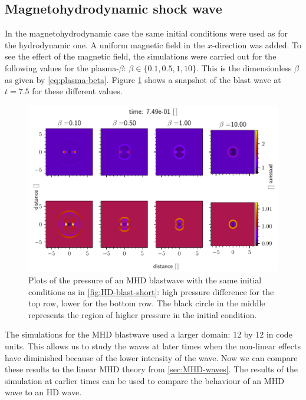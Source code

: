 \subsection{Magnetohydrodynamic shock wave}
In the magnetohydrodynamic case the same initial conditions were used as for the hydrodynamic one.
A uniform magnetic field in the $x$-direction was added. 
To see the effect of the magnetic field, the simulations were carried out for the following values for the plasma-$\beta$: $\beta \in \{0.1, 0.5,1,10\}$.
This is the dimensionless $\beta$ as given by \cref{eq:plasma-beta}.
Figure \ref{fig:MHD-blasts} shows a snapshot of the blast wave at $t=7.5$ for these different values.

\begin{figure}[H]
	\centering
	\includegraphics[width=\linewidth]{images/MHD-blasts.pdf}
	\caption{Plots of the pressure of an MHD blastwave with the same initial conditions as in \cref{fig:HD-blast-short}: high pressure difference for the top row, lower for the bottom row.
	The black circle in the middle represents the region of higher pressure in the initial condition.}
	\label{fig:MHD-blasts}
\end{figure}

The simulations for the MHD blastwave used a larger domain: 12 by 12 in code units.
This allows us to study the waves at later times when the non-linear effects have diminished because of the lower intensity of the wave.
Now we can compare these results to the linear MHD theory from \cref{sec:MHD-waves}.
The results of the simulation at earlier times can be used to compare the behaviour of an MHD wave to an HD wave.

